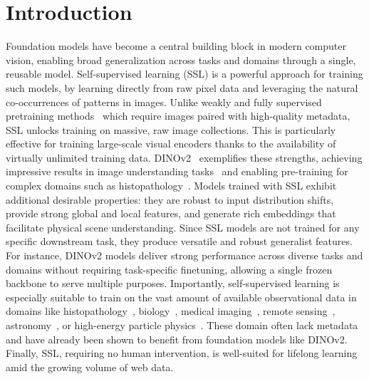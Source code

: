 



\section{Introduction}
Foundation models have become a central building block in modern computer vision, enabling broad generalization across tasks and domains through a single, reusable model.
Self-supervised learning (SSL) is a powerful approach for training such models, by learning directly from raw pixel data and leveraging the natural co-occurrences of patterns in images. 
Unlike weakly and fully supervised pretraining methods~\citep{radford2021learning,dehghani2023scaling,bolya2025perception} which require images paired with high-quality metadata, SSL unlocks training on massive, raw image collections. 
This is particularly effective for training large-scale visual encoders thanks to the availability of virtually unlimited training data.
DINOv2~\citep{oquab2024dinov2} exemplifies these strengths, achieving impressive results in image understanding tasks~\citep{wang2025vggt} and enabling pre-training for complex domains such as histopathology~\citep{chen2024uni}.
Models trained with SSL exhibit additional desirable properties: they are robust to input distribution shifts, provide strong global and local features, and generate rich embeddings that facilitate physical scene understanding. 
Since SSL models are not trained for any specific downstream task, they produce versatile and robust generalist features. 
For instance, DINOv2 models deliver strong performance across diverse tasks and domains without requiring task-specific finetuning, allowing a single frozen backbone to serve multiple purposes.
Importantly, self-supervised learning is especially suitable to train on the vast amount of available observational data in domains like histopathology~\citep{vorontsov2024foundation}, biology~\citep{kim2025self}, medical imaging~\citep{perez2025exploring}, remote sensing~\citep{cong2022satmae,tolan2024very}, astronomy~\citep{parker2024astroclip}, or high-energy particle physics~\citep{dillon2022symmetries}. 
These domain often lack metadata and have already been shown to benefit from foundation models like DINOv2.  
Finally, SSL, requiring no human intervention, is well-suited for lifelong learning amid the growing volume of web data.

